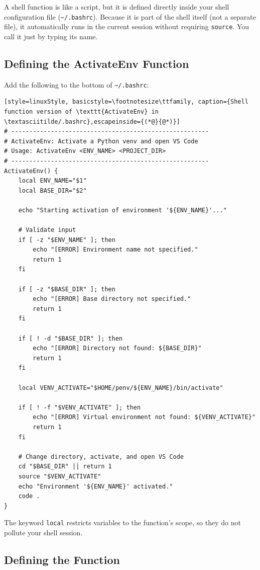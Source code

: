 A shell function is like a script, but it is defined directly inside
your shell configuration file (\texttt{\textasciitilde/.bashrc}).
Because it is part of the shell itself (not a separate file), it
automatically runs in the current session without requiring
\texttt{source}. You call it just by typing its name.

\subsection{Defining the ActivateEnv Function}

Add the following to the bottom of \texttt{\textasciitilde/.bashrc}:

\begin{lstlisting}[style=linuxStyle, basicstyle=\footnotesize\ttfamily, caption={Shell function version of \texttt{ActivateEnv} in \textasciitilde/.bashrc},escapeinside={(*@}{@*)}]
# -------------------------------------------------------
# ActivateEnv: Activate a Python venv and open VS Code
# Usage: ActivateEnv <ENV_NAME> <PROJECT_DIR>
# -------------------------------------------------------
ActivateEnv() {
    local ENV_NAME="$1"
    local BASE_DIR="$2"

    echo "Starting activation of environment '${ENV_NAME}'..."

    # Validate input
    if [ -z "$ENV_NAME" ]; then
        echo "[ERROR] Environment name not specified."
        return 1
    fi

    if [ -z "$BASE_DIR" ]; then
        echo "[ERROR] Base directory not specified."
        return 1
    fi

    if [ ! -d "$BASE_DIR" ]; then
        echo "[ERROR] Directory not found: ${BASE_DIR}"
        return 1
    fi

    local VENV_ACTIVATE="$HOME/penv/${ENV_NAME}/bin/activate"

    if [ ! -f "$VENV_ACTIVATE" ]; then
        echo "[ERROR] Virtual environment not found: ${VENV_ACTIVATE}"
        return 1
    fi

    # Change directory, activate, and open VS Code
    cd "$BASE_DIR" || return 1
    source "$VENV_ACTIVATE"
    echo "Environment '${ENV_NAME}' activated."
    code .
}
\end{lstlisting}

The keyword \texttt{local} restricts variables to the function's scope,
so they do not pollute your shell session.

\subsection{Defining the \ProjectName{} Function}

